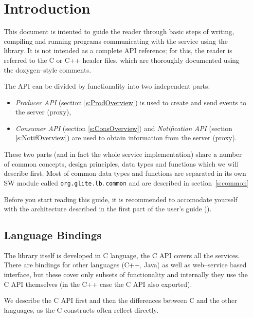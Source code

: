 
\section{Introduction}



This document is intented to guide the reader through basic steps
of writing, compiling and running programs communicating with the \LB
service using the \LB library. It is not intended as a complete API
reference; for this, the reader is referred to the C or C++ header
files, which are thoroughly documented using the doxygen--style
comments. 

The \LB API can be divided by functionality into two independent
parts:
\begin{itemize}
\item \textit{\LB Producer API} (section \ref{s:ProdOverview}) is used
to create and send events to the \LB server (proxy),
\item \textit{\LB Consumer API} (section \ref{s:ConsOverview}) and \textit{\LB
Notification API} (section \ref{s:NotifOverview}) are used to obtain
information from the  \LB server (proxy).
\end{itemize}
These two parts (and in fact the whole \LB service implementation)
share a number of common concepts, design principles, data types and
functions which we will describe first. Most of common data types and
functions are separated in its own SW module called
\verb'org.glite.lb.common' and are described in section~\ref{s:common}

%
Before you start reading this guide, it is recommended to accomodate
yourself with the \LB architecture described in the first part of the
\LB user's guide (\cite{lbug}).


\subsection{Language Bindings}
The \LB library itself is developed in C language, the C API covers
all the \LB services. There are bindings for other languages (C++,
Java) as well as web--service based interface, but these cover only
subsets of \LB functionality and internally they use the C API
themselves (in the C++ case the C API also exported).

We describe the C API first and then the differences between C and the
other languages, as the C constructs often reflect directly.

